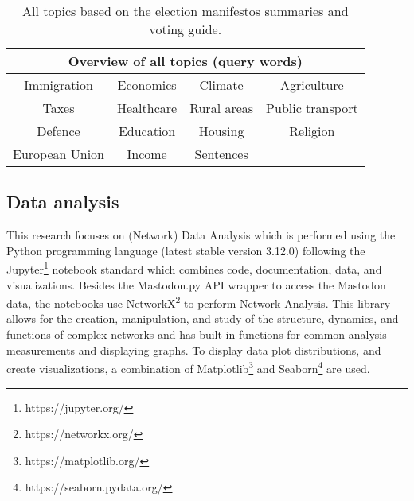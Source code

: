 \begin{table}
\centering
\begin{tabular}{||c c c c||} 
 \hline
 \multicolumn{4}{|c|}{\textbf{Overview of all topics (query words)}} \\
 \hline
 Immigration & Economics & Climate & Agriculture \\
 \hline
 Taxes & Healthcare & Rural areas & Public transport \\
 \hline
 Defence & Education & Housing & Religion \\
 \hline
 European Union & Income & Sentences &  \\
 \hline
\end{tabular}
\caption{All topics based on the election manifestos summaries and voting guide.}
\label{topic-table}
\end{table}

\subsection{Data analysis}

This research focuses on (Network) Data Analysis which is performed using the Python programming language (latest stable version 3.12.0) following the Jupyter\footnote{https://jupyter.org/} notebook standard which combines code, documentation, data, and visualizations. Besides the Mastodon.py API wrapper to access the Mastodon data, the notebooks use NetworkX\footnote{https://networkx.org/} to perform Network Analysis.
This library allows for the creation, manipulation, and study of the structure, dynamics, and functions of complex networks and has built-in functions for common analysis measurements and displaying graphs. To display data plot distributions, and create visualizations, a combination of Matplotlib\footnote{https://matplotlib.org/} and Seaborn\footnote{https://seaborn.pydata.org/} are used.
